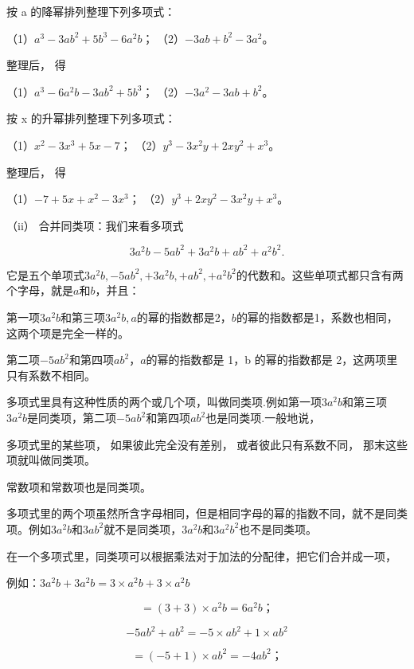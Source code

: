  按 a 的降幂排列整理下列多项式：

（1）\(a^3 - 3ab^2 + 5b^3 - 6a^2b\)； （2）\(-3ab + b^2 - 3a^2\)。

 整理后， 得

（1）\(a^3 - 6a^2b - 3ab^2 + 5b^3\)； （2）\(-3a^2 - 3ab + b^2\)。

 按 x 的升幂排列整理下列多项式：

（1）\(x^{2} - 3x^{3} + 5x - 7\)；
（2）\(y^{3} - 3x^{2}y + 2xy^{2} + x^{3}\)。

 整理后， 得

（1）\(-7 + 5x + x^2 - 3x^3\)； （2）\(y^3 + 2xy^2 - 3x^2y + x^3\)。

（ii） 合并同类项：我们来看多项式

\[
3 a ^{2} b - 5 a b ^{2} + 3 a ^{2} b + a b ^{2} + a ^{2} b ^{2}.
\]

它是五个单项式\(3a^{2}b, -5ab^{2}, + 3a^{2}b, + ab^{2}, + a^{2}b^{2}\)的代数和。这些单项式都只含有两个字母，就是\(a\)和\(b\)，并且：

第一项\(3a^{2}b\)和第三项\(3a^{2}b, a\)的幂的指数都是2，\(b\)的幂的指数都是1，系数也相同，这两个项是完全一样的。

第二项\(-5ab^{2}\)和第四项\(ab^{2}\)，\(a\)的幂的指数都是 1，b
的幂的指数都是 2，这两项里只有系数不相同。

多项式里具有这种性质的两个或几个项，叫做同类项.例如第一项\(3a^{2}b\)和第三项\(3a^{2}b\)是同类项，第二项\(-5ab^{2}\)和第四项\(ab^{2}\)也是同类项.一般地说，

多项式里的某些项， 如果彼此完全没有差别， 或者彼此只有系数不同，
那末这些项就叫做同类项。

常数项和常数项也是同类项。


多项式里的两个项虽然所含字母相同，但是相同字母的幂的指数不同，就不是同类项。例如\(3a^{2}b\)和\(3ab^{2}\)就不是同类项，\(3a^{2}b\)和\(3a^{2}b^{2}\)也不是同类项。

在一个多项式里，同类项可以根据乘法对于加法的分配律，把它们合并成一项，

例如：\(3a^{2}b + 3a^{2}b = 3\times a^{2}b + 3\times a^{2}b\)

\[
= (3 + 3) \times a ^{2} b = 6 a ^{2} b\text{；}
\]

\[
- 5 a b ^{2} + a b ^{2} = - 5 \times a b ^{2} + 1 \times a b ^{2}
\]

\[
= (- 5 + 1) \times a b ^{2} = - 4 a b ^{2}\text{；}
\]

